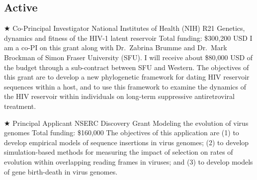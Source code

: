 \documentclass[11pt]{moderncv}
\begin{document}
%




\subsection {Active}


{$\bigstar$ Co-Principal Investigator}
{National Institutes of Health (NIH) R21}  %
{Genetics, dynamics and fitness of the HIV-1 latent reservoir}
{Total funding: \$300,200 USD}
{
I am a co-PI on this grant along with Dr.~Zabrina Brumme and Dr.~Mark Brockman of Simon Fraser University (SFU).
I will receive about \$80,000 USD of the budget through a sub-contract between SFU and Western.
The objectives of this grant are to develop a new phylogenetic framework for dating HIV reservoir sequences within a host, and to use this framework to examine the dynamics of the HIV reservoir within individuals on long-term suppressive antiretroviral treatment.
}

{$\bigstar$ Principal Applicant}
{NSERC Discovery Grant}
{Modeling the evolution of virus genomes}
{Total funding: \$160,000} %
{
The objectives of this application are (1) to develop empirical models of sequence insertions in virus genomes; (2) to develop simulation-based methods for measuring the impact of selection on rates of evolution within overlapping reading frames in viruses; and (3) to develop models of gene birth-death in virus genomes.\\
}
\end{document}
